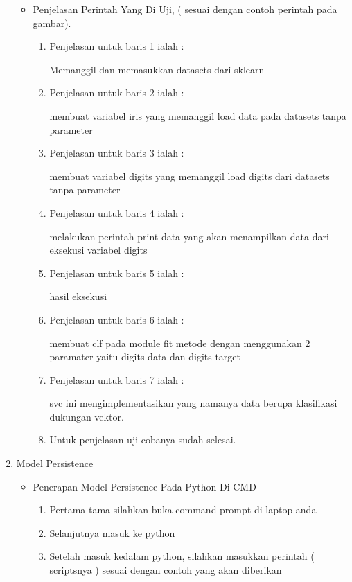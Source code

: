 \begin{enumerate}
\begin{itemize}
\par
\item Penjelasan Perintah Yang Di Uji, ( sesuai dengan contoh perintah pada gambar).
\begin{enumerate}
\item Penjelasan untuk baris 1 ialah : 
\par Memanggil dan memasukkan datasets dari sklearn
\par 
\par
\item Penjelasan untuk baris 2 ialah :
\par membuat variabel iris yang memanggil load data pada datasets tanpa parameter
\par
\item Penjelasan untuk baris 3 ialah :
\par membuat variabel digits yang memanggil load digits dari datasets tanpa parameter
\par
\item Penjelasan untuk baris 4 ialah :
\par melakukan perintah print data yang akan menampilkan data dari eksekusi variabel digits
\par
\item Penjelasan untuk baris 5 ialah :
\par hasil eksekusi
\par
\item Penjelasan untuk baris 6 ialah :
\par membuat clf pada module fit metode dengan menggunakan 2 paramater yaitu digits data dan digits target
\par
\item Penjelasan untuk baris 7 ialah :
\par svc ini mengimplementasikan yang namanya data berupa klasifikasi dukungan vektor.
\par
\item Untuk penjelasan uji cobanya sudah selesai.
\par
\end{enumerate}
\end{itemize}


\par
\item Model Persistence
\begin{itemize}
\item Penerapan Model Persistence Pada Python Di CMD
\begin{enumerate}
\item Pertama-tama silahkan buka command prompt di laptop anda
\item Selanjutnya masuk ke python 
\item Setelah masuk kedalam python, silahkan masukkan perintah ( scriptsnya ) sesuai dengan contoh yang akan diberikan


\end{enumerate}
\end{itemize}
\end{enumerate}

